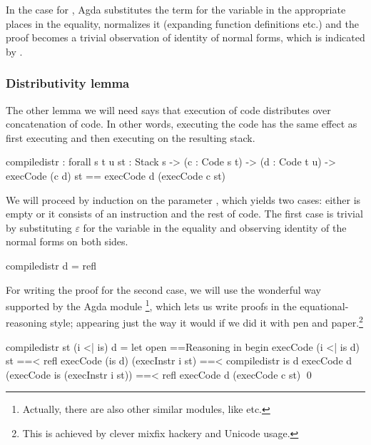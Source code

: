 \noindent In the case for , Agda substitutes the term 
for the variable  in the appropriate places in the equality, normalizes
it (expanding function definitions etc.) and the proof becomes a trivial observation of
identity of normal forms, which is indicated by .

\subsubsection{Distributivity lemma}

The other lemma we will need says that execution of code distributes over
concatenation of code. In other words, executing the code  has the same effect as first executing  and then executing
 on the resulting stack.

\label{sec:cor-compile-distr}\begin{code}
  compile\-distr : forall {s t u} {st : Stack s}
    -> (c : Code s t) -> (d : Code t u)
    -> execCode (c \app d) st == execCode d (execCode c st)
\end{code}

\noindent We will proceed by induction on the parameter , which yields
two cases: either  is empty or it consists of an instruction and the
rest of code. The first case is trivial by substituting $\varepsilon$ for the variable
 in the equality and observing identity of the normal forms on both sides.

\begin{code}
  compile\-distr \nil d = refl
\end{code}

\noindent For writing the proof for the second case, we will use the wonderful
way supported by the Agda module \footnote{Actually,
there are also other similar modules, like  etc.}, which
lets us write proofs in the equational-reasoning style; appearing just the way
it would if we did it with pen and paper.\footnote{This is achieved by clever
mixfix hackery and Unicode usage.}

\begin{code}
  compile\-distr {st} (i <| is) d = let open ==\-Reasoning in begin
    execCode (i <| is \app d) st
      ==< refl \>
    execCode (is \app d) (execInstr i st)
      ==< compile\-distr is d \>
    execCode d (execCode is (execInstr i st))
      ==< refl \>
    execCode d (execCode c st)
    \qed
\end{code}

